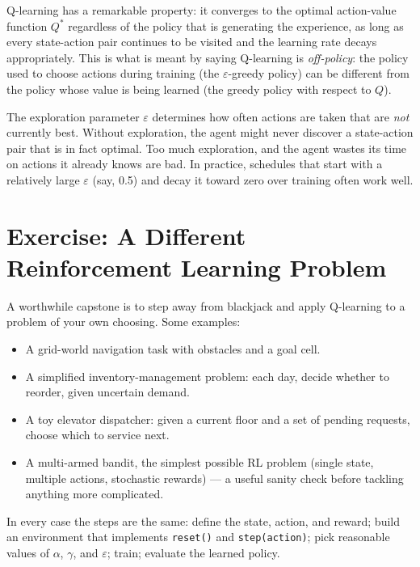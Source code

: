 \documentclass[../../book.tex]{subfiles}
\begin{document}

Q-learning has a remarkable property: it converges to the optimal action-value function $Q^*$ regardless of the policy that is generating the experience, as long as every state-action pair continues to be visited and the learning rate decays appropriately.  This is what is meant by saying Q-learning is \emph{off-policy}: the policy used to choose actions during training (the $\varepsilon$-greedy policy) can be different from the policy whose value is being learned (the greedy policy with respect to $Q$).

The exploration parameter $\varepsilon$ determines how often actions are taken that are \emph{not} currently best.  Without exploration, the agent might never discover a state-action pair that is in fact optimal.  Too much exploration, and the agent wastes its time on actions it already knows are bad.  In practice, schedules that start with a relatively large $\varepsilon$ (say, 0.5) and decay it toward zero over training often work well.

\section{Exercise: A Different Reinforcement Learning Problem}
\label{sec:rl_problem_design}

A worthwhile capstone is to step away from blackjack and apply Q-learning to a problem of your own choosing.  Some examples:

\begin{itemize}
    \item A grid-world navigation task with obstacles and a goal cell.
    \item A simplified inventory-management problem: each day, decide whether to reorder, given uncertain demand.
    \item A toy elevator dispatcher: given a current floor and a set of pending requests, choose which to service next.
    \item A multi-armed bandit, the simplest possible RL problem (single state, multiple actions, stochastic rewards) --- a useful sanity check before tackling anything more complicated.
\end{itemize}

In every case the steps are the same: define the state, action, and reward; build an environment that implements \lstinline{reset()} and \lstinline{step(action)}; pick reasonable values of $\alpha$, $\gamma$, and $\varepsilon$; train; evaluate the learned policy.
\end{document}

